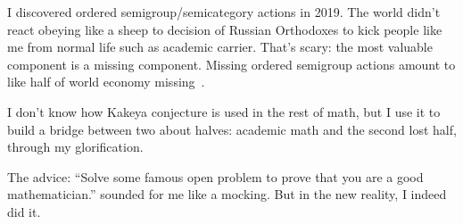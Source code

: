 \documentclass[oneside,draft]{amsart}
\begin{document}
I discovered ordered semigroup/semicategory actions in 2019. The world didn't react obeying like a sheep to decision of Russian Orthodoxes to kick people like me from normal life such as academic carrier. That's scary: the most valuable component is a missing component. Missing ordered semigroup actions amount to like half of world economy missing~\cite{osa-important}.

I don't know how Kakeya conjecture is used in the rest of math, but I use it to build a bridge between two about halves: academic math and the second lost half, through my glorification.

The advice: ``Solve some famous open problem to prove that you are a good mathematician.'' sounded for me like a mocking. But in the new reality, I indeed did it.



\end{document}
